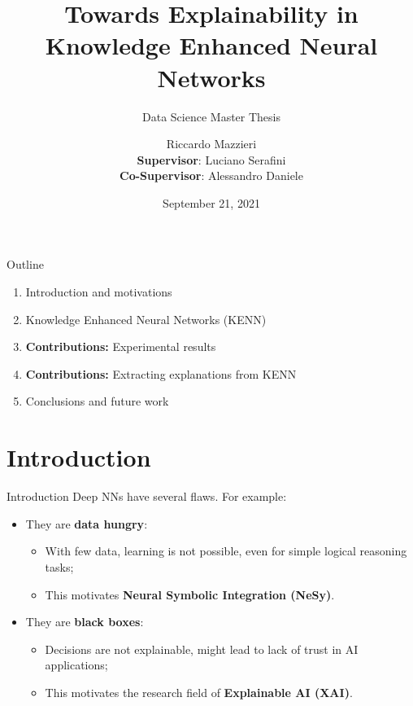 \documentclass{beamer}
\title{Towards Explainability in Knowledge Enhanced Neural Networks}
\subtitle{Data Science Master Thesis}
\author{Riccardo Mazzieri \\ \vspace{10pt}
\textbf{Supervisor}: Luciano Serafini\\
\textbf{Co-Supervisor}: Alessandro Daniele \vspace{10pt}}
\date{September 21, 2021}
\begin{document}
	\maketitle

	\begin{frame}{Outline}
\begin{enumerate}
	\item Introduction and motivations \vspace{12pt}
	\item Knowledge Enhanced Neural Networks (KENN) \vspace{12pt}
	\item \textcolor{unipd}{\textbf{Contributions:} Experimental results} \vspace{12pt}
	\item \textcolor{unipd}{\textbf{Contributions:} Extracting explanations from KENN} \vspace{12pt}
	\item Conclusions and future work
\end{enumerate}
	\end{frame}


	\section{Introduction}

	\begin{frame}{Introduction}
		Deep NNs have several flaws. For example:
		\begin{itemize}
			\item They are \textbf{data hungry}:
			\begin{itemize}
				\item With few data, learning is not possible, even for simple logical reasoning tasks;
				\item This motivates \textbf{Neural Symbolic Integration (NeSy)}.
				\pause
			\end{itemize}
			\item They are \textbf{black boxes}:
			\begin{itemize}
				\item Decisions are not explainable, might lead to lack of trust in AI applications;
				\item This motivates the research field of \textbf{Explainable AI (XAI)}.
			\end{itemize}
		\end{itemize}
	\end{frame}
\end{document}
